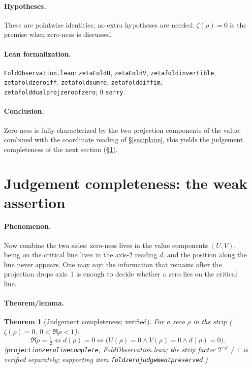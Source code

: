 \documentclass{article}
\renewcommand{\_}{\underscoreOrig\allowbreak}
\newtheorem{theorem}{Theorem}[section]
\newcommand{\zt}{\zeta}
\begin{document}
\paragraph{Hypotheses.} These are pointwise identities; no extra
hypotheses are needed; $\zt(\rho)=0$ is the premise when zero-ness is
discussed.

\paragraph{Lean formalization.} \texttt{FoldObservation.lean}:
\texttt{zetaFoldU}, \texttt{zetaFoldV},
\texttt{zeta\_fold\_invertible}, \texttt{zeta\_fold\_zero\_iff},
\texttt{zeta\_fold\_sum\_re}, \texttt{zeta\_fold\_diff\_im},
\texttt{zeta\_fold\_dual\_proj\_zero\_of\_zero}; 0 \texttt{sorry}.

\paragraph{Conclusion.} Zero-ness is fully characterized by the two
projection components of the value; combined with the coordinate reading
of \S\ref{sec:plane}, this yields the judgement completeness of the next
section (\S\ref{sec:complete}).

\section{Judgement completeness: the weak assertion}
\label{sec:complete}

\paragraph{Phenomenon.} Now combine the two sides: zero-ness lives in
the value components $(U,V)$, being on the critical line lives in the
axis-2 reading $d$, and the position along the line never appears. One
may say: the information that remains after the projection drops axis~1
is enough to decide whether a zero lies on the critical line.

\paragraph{Theorem/lemma.}
\begin{theorem}[Judgement completeness; verified]
\label{thm:weak}
For a zero $\rho$ in the strip ($\zt(\rho)=0$, $0<\Re\rho<1$):
\[
  \Re\rho=\tfrac12
    \iff d(\rho)=0
    \iff \big(U(\rho)=0 \wedge V(\rho)=0 \wedge d(\rho)=0\big).
\]
(\texttt{projection\_zero\_line\_complete}, FoldObservation.lean; the
strip factor $2^{-\rho}\ne1$ is verified separately; supporting item
\texttt{fold\_zero\_judgement\_preserved}.)
\end{theorem}
\end{document}
